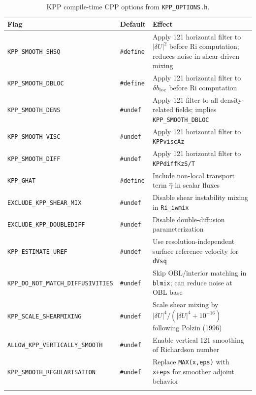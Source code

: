 \documentclass[12pt,letterpaper]{article}
\newcommand{\ghat}{\hat{\gamma}}
\begin{document}
\begin{longtable}{p{5cm} l p{5cm}}  
\toprule  
\textbf{Flag} & \textbf{Default} & \textbf{Effect} \\  
\midrule  
\endhead  
\texttt{KPP\_SMOOTH\_SHSQ} & \texttt{\#define} &  
  Apply 121 horizontal filter to $|\delta U|^2$ before Ri computation;  
  reduces noise in shear-driven mixing \\[4pt]  
\texttt{KPP\_SMOOTH\_DBLOC} & \texttt{\#define} &  
  Apply 121 horizontal filter to $\delta b_{\rm loc}$ before Ri  
  computation \\[4pt]  
\texttt{KPP\_SMOOTH\_DENS} & \texttt{\#undef} &  
  Apply 121 filter to all density-related fields; implies  
  \texttt{KPP\_SMOOTH\_DBLOC} \\[4pt]  
\texttt{KPP\_SMOOTH\_VISC} & \texttt{\#undef} &  
  Apply 121 horizontal filter to \texttt{KPPviscAz} \\[4pt]  
\texttt{KPP\_SMOOTH\_DIFF} & \texttt{\#undef} &  
  Apply 121 horizontal filter to \texttt{KPPdiffKzS/T} \\[4pt]  
\texttt{KPP\_GHAT} & \texttt{\#define} &  
  Include non-local transport term $\ghat$ in scalar fluxes \\[4pt]  
\texttt{EXCLUDE\_KPP\_SHEAR\_MIX} & \texttt{\#undef} &  
  Disable shear instability mixing in \texttt{Ri\_iwmix} \\[4pt]  
\texttt{EXCLUDE\_KPP\_DOUBLEDIFF} & \texttt{\#undef} &  
  Disable double-diffusion parameterization \\[4pt]  
\texttt{KPP\_ESTIMATE\_UREF} & \texttt{\#undef} &  
  Use resolution-independent surface reference velocity for \texttt{dVsq} \\[4pt]  
\texttt{KPP\_DO\_NOT\_MATCH\_DIFFUSIVITIES} & \texttt{\#undef} &  
  Skip OBL/interior matching in \texttt{blmix}; can reduce noise at OBL base \\[4pt]  
\texttt{KPP\_SCALE\_SHEARMIXING} & \texttt{\#undef} &  
  Scale shear mixing by $|\delta U|^4/(|\delta U|^4 + 10^{-16})$  
  following Polzin (1996) \\[4pt]  
\texttt{ALLOW\_KPP\_VERTICALLY\_SMOOTH} & \texttt{\#undef} &  
  Enable vertical 121 smoothing of Richardson number \\[4pt]  
\texttt{KPP\_SMOOTH\_REGULARISATION} & \texttt{\#undef} &  
  Replace \texttt{MAX(x,eps)} with \texttt{x+eps} for smoother  
  adjoint behavior \\  
\bottomrule  
\caption{KPP compile-time CPP options from \texttt{KPP\_OPTIONS.h}.}  
\label{tab:cppflags}  
\end{longtable}  
  
\end{document}
